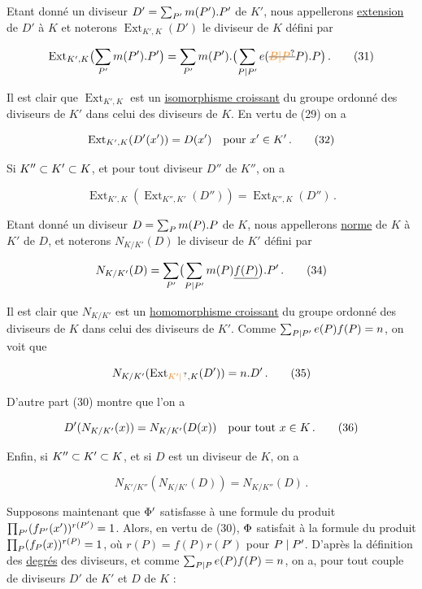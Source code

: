 Etant donné un diviseur $D'=\sum_{P'}m(P').P'$ de $K'$, nous appellerons \uline{extension} de $D'$ à $K$ et noterons $\operatorname{Ext}_{K',K}(D')$ le diviseur de $K$ défini par

\[ \operatorname{Ext}_{K',K}\bigl(\handwritten{\sum}_{P'}m(P').P'\bigr)=\handwritten{\sum}_{P'}m(P').\bigl(\handwritten{\sum}_{P\handwritten{\mid} P'}e(\deleted{\unsure{B|P}}P).P\bigr)\,.\tag*{(31)} \]

Il est clair que $\operatorname{Ext}_{K',K}$ est un \uline{isomorphisme croissant} du groupe  ordonné des diviseurs de $K'$ dans celui des diviseurs de $K$. En vertu de (29) on a

\[ \operatorname{Ext}_{K',K}(D'(x'))=D(x')\quad\text{pour }x'\in K'\,.\tag*{(32)} \]

Si $K''\subset K'\subset K$, et pour tout diviseur $D''$ de $K''$, on a

\[ \operatorname{Ext}_{K',K}(\operatorname{Ext}_{K'',K'}(D''))=\operatorname{Ext}_{K'',K}(D'')\,.\tag*{(33)} \]

Etant donné un diviseur $D=\sum_P m(P).P$ de $K$, nous appellerons \uline{norme} de $K$ à $K'$ de $D$, et noterons $N_{K/K'}(D)$ le diviseur de $K'$ défini par

\[ N_{K/K'}(D)=\sum_{P'}\bigl(\sum_{P\mid P'}m(P)\underline{f(P)}\bigr).P'\,.\tag*{(34)} \]

Il est clair que $N_{K/K'}$ est un \uline{homomorphisme croissant} du groupe ordonné des diviseurs de $K$ dans celui des diviseurs de $K'$. Comme $\sum_{P\mid P'}e(P)f(P)=n$, on voit que

\[ N_{K/K'}(\operatorname{Ext}_{\unsure{K'|\,},K}(D'))=n.D'\,.\tag*{(35)} \]

D'autre part (30) montre que l'on a

\[ D'(N_{K/K'}(x))=N_{K/K'}(D(x))\quad\text{pour tout }x\in K\,.\tag*{(36)} \]

Enfin, si $K''\subset K'\subset K$, et si $D$ est un diviseur de $K$, on a

\[ N_{K'/K''}(N_{K/K'}(D))=N_{K/K''}(D)\,.\tag*{(37)} \]

Supposons maintenant que $\Phi'$ satisfasse à une formule du produit $\prod_{P'}(f_{P'}(x'))^{r(P')}=1$. Alors, en vertu de (30), $\Phi$ satisfait à la formule du produit $\prod_P(f_P(x))^{r(P)}=1$, où $r(P)=f(P)r(P')$ pour $P\mid P'$. D'après la définition des \uline{degrés} des diviseurs, et comme $\sum_{P\mid P}e(P)f(P)=n$, on a, pour tout couple de diviseurs $D'$ de $K'$ et $D$ de $K$ :

